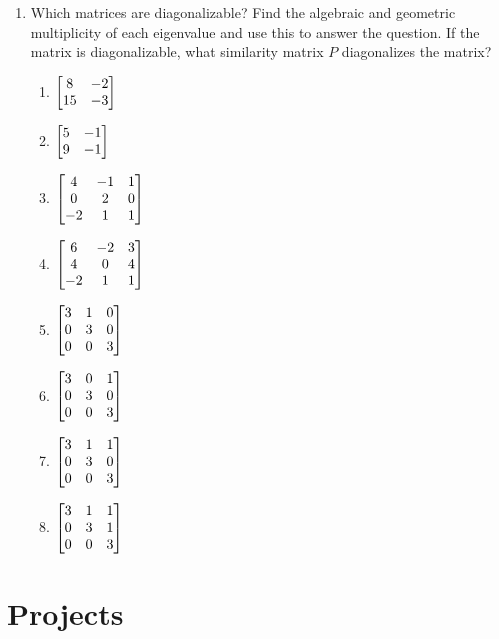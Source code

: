 \begin{enumerate}
\item Which matrices are diagonalizable?  Find the algebraic and geometric multiplicity of each eigenvalue and use this to answer the question.  If the matrix is diagonalizable, what similarity matrix $P$ diagonalizes the matrix?
\begin{multicols}{4}
\begin{enumerate}
	\item 
	$\begin{bmatrix}  
	8 & -2 \\
 	15 & -3
 	 \end{bmatrix}$
	\item 
	$\begin{bmatrix}  
 5 & -1 \\
 9 & -1
 	 \end{bmatrix}$
	\item 
	$\begin{bmatrix}  
 4 & -1 & 1 \\
 0 & 2 & 0 \\
 -2 & 1 & 1
 	 \end{bmatrix}$
	\item 
	$\begin{bmatrix}  
 6 & -2 & 3 \\
 4 & 0 & 4 \\
 -2 & 1 & 1
 	 \end{bmatrix}$
	\item 
	$\begin{bmatrix}  
 3 & 1 & 0 \\
 0 & 3 & 0 \\
 0 & 0 & 3
 	 \end{bmatrix}$
	\item 
	$\begin{bmatrix}  
 3 & 0 & 1 \\
 0 & 3 & 0 \\
 0 & 0 & 3
 	 \end{bmatrix}$
	\item 
	$\begin{bmatrix}  
 3 & 1 & 1 \\
 0 & 3 & 0 \\
 0 & 0 & 3
 	 \end{bmatrix}$
	\item 
	$\begin{bmatrix}  
 3 & 1 & 1 \\
 0 & 3 & 1 \\
 0 & 0 & 3
 	 \end{bmatrix}$
\end{enumerate}
\end{multicols}

\end{enumerate}

\newpage
\section{Projects}

